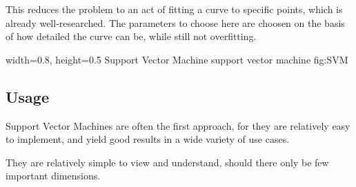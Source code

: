 This reduces the problem to an act of fitting a curve to specific points, which is already well-researched. The parameters to choose here are choosen on the basis of how detailed the curve can be, while still not overfitting.

    {width=0.8\textwidth, height=0.5\textheight} %
    {Support Vector Machine}   %
    {support vector machine}   %
    {fig:SVM}    %

\subsection{Usage}
Support Vector Machines are often the first approach, for they are relatively easy to implement, and yield good results in a wide variety of use cases. 

They are relatively simple to view and understand, should there only be few important dimensions.

